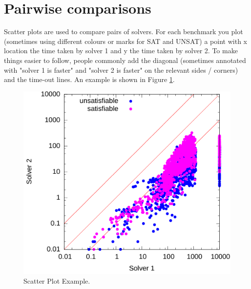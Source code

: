 \documentclass{easychair}
\begin{document}
\section{Pairwise comparisons}
Scatter plots are used to compare pairs of solvers.  For each benchmark you plot (sometimes using different colours or marks for SAT and UNSAT) a point with x location the time taken by solver 1 and y the time taken by solver 2.  To make things easier to follow, people commonly add the diagonal (sometimes annotated with "solver 1 is faster"
and "solver 2 is faster" on the relevant sides / corners) and the time-out lines.
An example is shown in Figure \ref{Fig:scatter}.

\begin{figure}[t]
\centering
\includegraphics[scale=0.8]{scatter.pdf}
\caption{Scatter Plot Example.\label{Fig:scatter}}
\end{figure}



\end{document}
